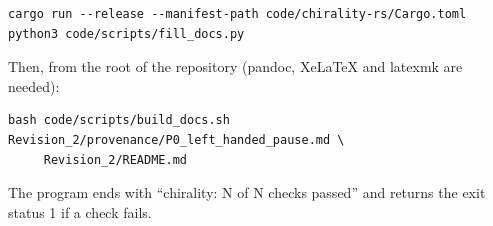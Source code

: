 \documentclass[
  10pt,
]{article}
\begin{document}
\begin{verbatim}
cargo run --release --manifest-path code/chirality-rs/Cargo.toml
python3 code/scripts/fill_docs.py
\end{verbatim}

Then, from the root of the repository (pandoc, XeLaTeX and latexmk are
needed):

\begin{verbatim}
bash code/scripts/build_docs.sh Revision_2/provenance/P0_left_handed_pause.md \
     Revision_2/README.md
\end{verbatim}

The program ends with ``chirality: N of N checks passed'' and returns
the exit status 1 if a check fails.
\end{document}
